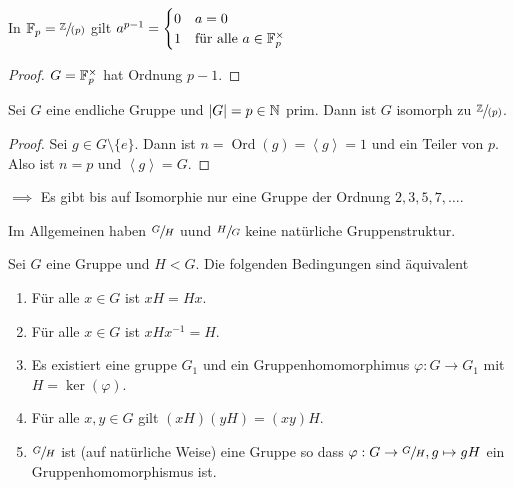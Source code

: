 \begin{corollary}
	In $\mathbb{F}_{p} = \sfrac{\mathbb{Z}}{(p)}$ gilt $a^{p-1} = \begin{cases}
		0 &a = 0\\
		1 &\text{für alle } a \in \mathbb{F}_{p}^{\times}
	\end{cases}$
\end{corollary}

\begin{proof}
	$G = \mathbb{F}_{p}^{\times }$ hat Ordnung $p-1$.
\end{proof}

\begin{corollary}
	Sei $G$ eine endliche Gruppe und $\abs{G} = p \in \mathbb{N}$ prim. Dann ist $G$ isomorph zu $\sfrac{\mathbb{Z}}{(p)}$.
\end{corollary}

\begin{proof}
	Sei $g \in G \setminus \{e\} $. Dann ist $n = \operatorname{Ord}(g) = \left< g \right> = 1$ und ein Teiler von $p$.
	Also ist $n = p$ und $\left< g \right> = G$.
\end{proof}

$\implies$ Es gibt bis auf Isomorphie nur eine Gruppe der Ordnung $2,3,5,7,\ldots$.

Im Allgemeinen haben $\sfrac{G}{H}$ uund $\sfrac{H}{G}$ keine natürliche Gruppenstruktur.

\begin{theorem}
	Sei $G$ eine Gruppe und $H < G$. Die folgenden Bedingungen sind äquivalent
	\begin{enumerate}[(1)]
		\item Für alle $x \in G$ ist $x H = H x$.
		\item Für alle  $x \in G$ ist $x H x^{-1} = H$.
		\item Es existiert eine gruppe $G_1$ und ein Gruppenhomomorphimus $\varphi: G \to G_1$ mit $H = \ker(\varphi)$.
		\item Für alle $x,y \in G$ gilt $(xH)(yH) = (xy) H$.
		\item $\sfrac{G}{H}$ ist (auf natürliche Weise) eine Gruppe so dass $\varphi: G \to \sfrac{G}{H}, g \mapsto g H$ ein Gruppenhomomorphismus ist.
	\end{enumerate}
\end{theorem}

